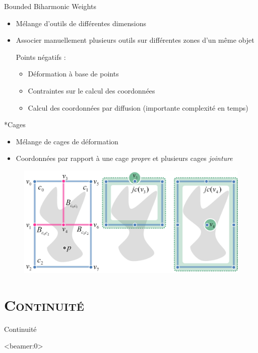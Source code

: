 \documentclass[xcolor=x11names,compress]{beamer}
\renewcommand{\(}{\begin{columns}} \renewcommand{\)}{\end{columns}}
\newcommand{\<}[1]{\begin{column}{#1}} \renewcommand{\>}{\end{column}}
\begin{document}
\begin{frame}{Bounded Biharmonic Weights}
  \begin{itemize}
  \item Mélange d'outils de différentes dimensions
  \item Associer manuellement plusieurs outils sur différentes zones
    d'un même objet
    \begin{alertblock}{Points négatifs : }
      \begin{itemize}
      \item Déformation à base de points
      \item Contraintes sur le calcul des coordonnées
      \item Calcul des coordonnées par diffusion (importante
        complexité en temps)
      \end{itemize}
    \end{alertblock}
  \end{itemize}
\end{frame}

\begin{frame}{*Cages}
  \begin{itemize}
  \item Mélange de cages de déformation
  \item Coordonnées par rapport à une cage \textit{propre} et plusieurs cages \textit{jointure}
  \end{itemize}
\begin{figure}[h]
\begin{center}
\includegraphics[scale=0.07]{joinCages}
\end{center}
\end{figure}
\end{frame}

\section{\scshape Continuité}
\begin{frame}{Continuité}

\end{frame}

\appendix

\begin{frame}<beamer:0>


\end{frame}
\end{document}
